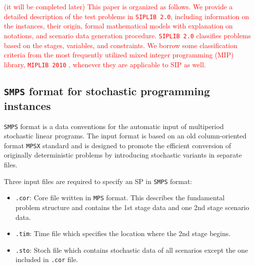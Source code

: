 
\textcolor{red}{(it will be completed later) This paper is organized as follows. We provide a detailed description of the test problems in \texttt{SIPLIB 2.0}, including information on the instances, their origin, formal mathematical models with explanation on notations, and scenario data generation procedure. \texttt{SIPLIB 2.0} classifies problems based on the stages, variables, and constraints. We borrow some classification criteria from the most frequently utilized mixed integer programming (MIP) library, \texttt{MIPLIB 2010} \cite{MIPLIB}, whenever they are applicable to SIP as well.}



\subsection{\texttt{SMPS} format for stochastic programming instances} \label{subsec:smps}
\texttt{SMPS} format \cite{SMPS} is a data conventions for the automatic input of multiperiod stochastic linear programs. The input format is based on an old column-oriented format \texttt{MPSX} standard and is designed to promote the efficient conversion of originally deterministic problems by introducing stochastic variants in separate files. 

Three input files are required to specify an SP in \texttt{SMPS} format:
\begin{itemize}
	\item \texttt{.cor}: Core file written in \texttt{MPS} format. This describes the fundamental problem structure and contains the 1st stage data and one 2nd stage scenario data.
	\item \texttt{.tim}: Time file which specifies the location where the 2nd stage begins.
	\item \texttt{.sto}: Stoch file which contains stochastic data of all scenarios except the one included in \texttt{.cor} file.
\end{itemize}



